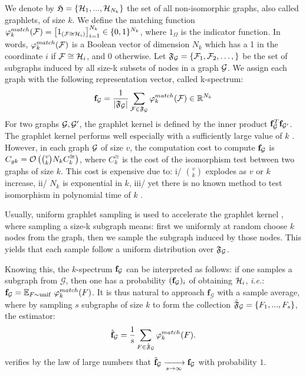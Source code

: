 \documentclass{article}
\begin{document}
We denote by  $\mathfrak{H}=\{\mathcal{H}_1,..., \mathcal{H}_{N_k}\}$  the set of all non-isomorphic graphs, also called graphlets, of size $k$. We define the matching function $\varphi_k^{match}(\mathcal{F}) = \left[ 1_{(\mathcal{F} \cong \mathcal{H}_i)}\right]_{i=1}^{N_k} \in \{0,1\}^{N_k}$, where $1_\Omega$ is the indicator function. In words, $\varphi^{match}_k(\mathcal{F})$ is a Boolean vector of dimension $N_k$ which has a 1 in the coordinate $i$ if $\mathcal{F}\cong \mathcal{H}_i$, and $0$ otherwise. 
Let $\mathfrak{F}_{\mathcal{G}}=\{\mathcal{F}_1,\mathcal{F}_2,\ldots,\}$ be the set of subgraphs induced by all size-k subsets of nodes  in a graph $\mathcal{G}$. We assign each graph with the following representation vector, called k-spectrum:
\begin{equation}
\mathbf{f}_\mathcal{G}=\frac{1}{|\mathfrak{F}_\mathcal{G}|}\sum_{\mathcal{F}\in\mathfrak{F}_\mathcal{G}} \varphi^{match}_k (\mathcal{F}) \in \mathbb{R} ^{N_k}
\end{equation}
For two graphs $\mathcal{G},\mathcal{G}'$, the graphlet kernel is defined by the inner product $\mathbf{f}_{\mathcal{G}}^T\mathbf{f}_{\mathcal{G}'}$. The graphlet kernel performs well especially with a sufficiently large value of $k$ \cite{graphlet_kernel}. However, in each graph $\mathcal{G}$ of size $v$, the computation cost to compute $\mathbf{f}_{\mathcal{G}}$ is $ C_{gk}= \mathcal{O}\left(\tbinom{v}{k} N_k C^{\cong}_k\right)$, where $C^{\cong}_k$ is the cost of the isomorphism test between two graphs of size $k$. This cost is expensive due to: i/ $\binom{v}{k}$ explodes as $v$ or $k$ increase, ii/ $N_k$ is exponential in $k$, iii/ yet there is no known method to test isomorphism in polynomial time of $k$ \cite{isomorphism_np}. 

Usually, uniform graphlet sampling is used to accelerate the graphlet kernel \cite{graphlet_kernel}, where sampling a size-k subgraph means: first we uniformly at random choose $k$ nodes from the graph, then we sample the subgraph induced by those  nodes. This yields that each sample follow a uniform distribution over $\mathfrak{F}_{\mathcal{G}}$.

Knowing this, the $k$-spectrum $\mathbf{f}_{\mathcal{G}}$ can be interpreted as follows: if one samples a subgraph from $\mathcal{G}$, then one has a probability $(\mathbf{f}_{\mathcal{G}})_i$ of obtaining $\mathcal{H}_i$, \emph{i.e.}: $	\label{eq:histo_unif}
	\mathbf{f}_\mathcal{G} = \mathbb{E}_{F \sim {\rm unif}} ~\varphi^{match}_k(F)$. 
	It is thus natural to approach $\mathbf{f}_\mathcal{G}$ with a sample average, where by sampling $s$ subgraphs of size $k$ to form the collection 
$\hat{\mathfrak{F}}_{\mathcal{G}}=\{F_1,...,F_s\}$, the estimator:
\begin{align}
	\label{eq:fhat_unif}
	\hat{\mathbf{f}}_\mathcal{G} =\frac{1}{s}\sum_{F\in\hat{\mathfrak{F}}_{\mathcal{G}}} \varphi^{match}_k(F).
\end{align}
verifies by the law of large numbers that $\hat{\mathbf{f}}_{\mathcal{G}} \xrightarrow[s \to \infty]{} \mathbf{f}_\mathcal{G}$ with probability $1$.
\end{document}
